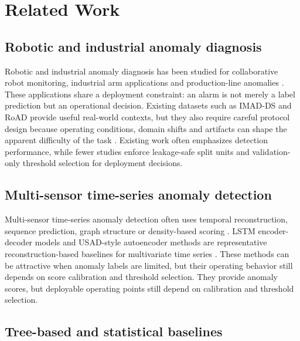\section{Related Work}



\subsection{Robotic and industrial anomaly diagnosis}



Robotic and industrial anomaly diagnosis has been studied for collaborative robot monitoring, industrial arm applications and production-line anomalies \cite{Narayanan2018IndustrialArm,Gaiardelli2023RoAD}. These applications share a deployment constraint: an alarm is not merely a label prediction but an operational decision. Existing datasets such as IMAD-DS and RoAD provide useful real-world contexts, but they also require careful protocol design because operating conditions, domain shifts and artifacts can shape the apparent difficulty of the task \cite{Augusti2024IMADDS,Gaiardelli2023RoAD}. Existing work often emphasizes detection performance, while fewer studies enforce leakage-safe split units and validation-only threshold selection for deployment decisions.



\subsection{Multi-sensor time-series anomaly detection}



Multi-sensor time-series anomaly detection often uses temporal reconstruction, sequence prediction, graph structure or density-based scoring \cite{BlazquezGarcia2021TimeSeriesSurvey,Malhotra2016LSTMEncDec,Audibert2020USAD}. LSTM encoder-decoder models and USAD-style autoencoder methods are representative reconstruction-based baselines for multivariate time series \cite{Malhotra2016LSTMEncDec,Audibert2020USAD}. These methods can be attractive when anomaly labels are limited, but their operating behavior still depends on score calibration and threshold selection. They provide anomaly scores, but deployable operating points still depend on calibration and threshold selection.



\subsection{Tree-based and statistical baselines}



